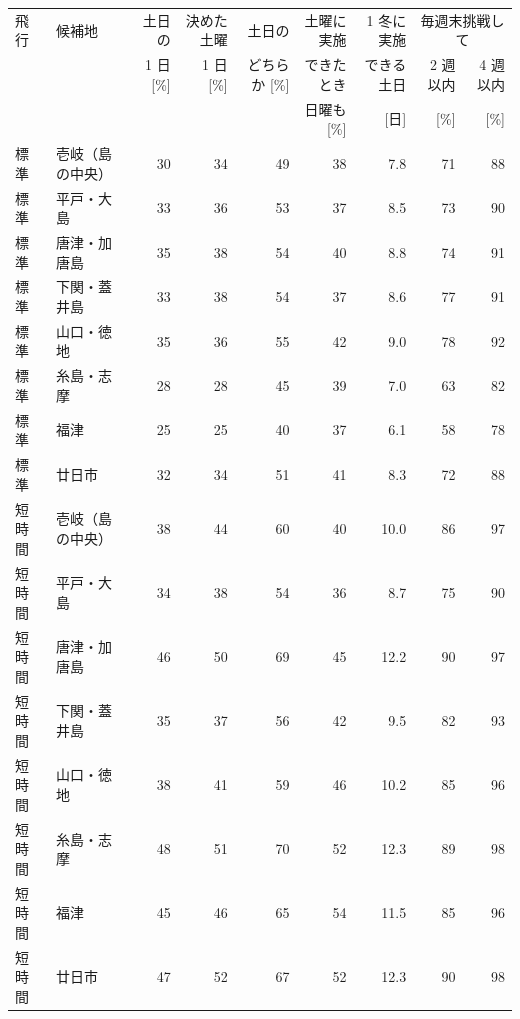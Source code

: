 \begin{tabular}{llrrrrrrr}
\toprule
飛行 & 候補地 & 土日の & 決めた土曜 & 土日の & 土曜に実施 & 1 冬に実施 & \multicolumn{2}{c}{毎週末挑戦して} \\
& & 1 日 [\%] & 1 日 [\%] & どちらか [\%] & できたとき & できる土日 & 2 週以内 & 4 週以内 \\
& & & & & 日曜も [\%] & [日] & [\%] & [\%] \\
\midrule
標準 & 壱岐（島の中央） & 30 & 34 & 49 & 38 & 7.8 & 71 & 88 \\
標準 & 平戸・大島 & 33 & 36 & 53 & 37 & 8.5 & 73 & 90 \\
標準 & 唐津・加唐島 & 35 & 38 & 54 & 40 & 8.8 & 74 & 91 \\
標準 & 下関・蓋井島 & 33 & 38 & 54 & 37 & 8.6 & 77 & 91 \\
標準 & 山口・徳地 & 35 & 36 & 55 & 42 & 9.0 & 78 & 92 \\
標準 & 糸島・志摩 & 28 & 28 & 45 & 39 & 7.0 & 63 & 82 \\
標準 & 福津 & 25 & 25 & 40 & 37 & 6.1 & 58 & 78 \\
標準 & 廿日市 & 32 & 34 & 51 & 41 & 8.3 & 72 & 88 \\
\midrule
短時間 & 壱岐（島の中央） & 38 & 44 & 60 & 40 & 10.0 & 86 & 97 \\
短時間 & 平戸・大島 & 34 & 38 & 54 & 36 & 8.7 & 75 & 90 \\
短時間 & 唐津・加唐島 & 46 & 50 & 69 & 45 & 12.2 & 90 & 97 \\
短時間 & 下関・蓋井島 & 35 & 37 & 56 & 42 & 9.5 & 82 & 93 \\
短時間 & 山口・徳地 & 38 & 41 & 59 & 46 & 10.2 & 85 & 96 \\
短時間 & 糸島・志摩 & 48 & 51 & 70 & 52 & 12.3 & 89 & 98 \\
短時間 & 福津 & 45 & 46 & 65 & 54 & 11.5 & 85 & 96 \\
短時間 & 廿日市 & 47 & 52 & 67 & 52 & 12.3 & 90 & 98 \\
\bottomrule
\end{tabular}
